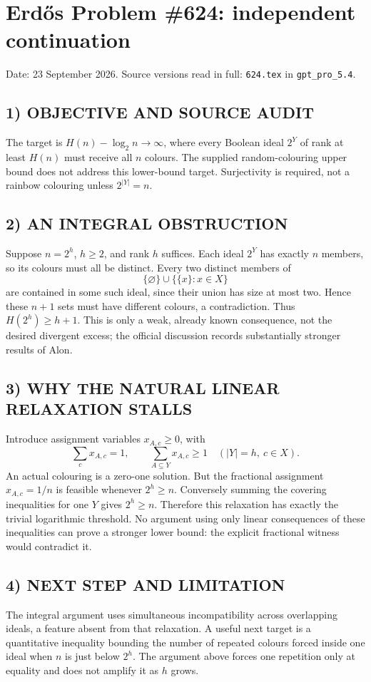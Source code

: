 \section{Erd\H{o}s Problem \#624: independent continuation}
\noindent Date: 23 September 2026. Source versions read in full: \texttt{624.tex} in \texttt{gpt\_pro\_5.4}.

\subsection*{1) OBJECTIVE AND SOURCE AUDIT}
The target is $H(n)-\log_2 n\to\infty$, where every Boolean ideal $2^Y$ of rank at least $H(n)$ must receive all $n$ colours. The supplied random-colouring upper bound does not address this lower-bound target. Surjectivity is required, not a rainbow colouring unless $2^{|Y|}=n$.
\subsection*{2) AN INTEGRAL OBSTRUCTION}
Suppose $n=2^h$, $h\ge2$, and rank $h$ suffices. Each ideal $2^Y$ has exactly $n$ members, so its colours must all be distinct. Every two distinct members of
\[
\{\varnothing\}\cup\{\{x\}:x\in X\}
\]
are contained in some such ideal, since their union has size at most two. Hence these $n+1$ sets must have different colours, a contradiction. Thus $H(2^h)\ge h+1$. This is only a weak, already known consequence, not the desired divergent excess; the official discussion records substantially stronger results of Alon.
\subsection*{3) WHY THE NATURAL LINEAR RELAXATION STALLS}
Introduce assignment variables $x_{A,c}\ge0$, with
\[
\sum_c x_{A,c}=1,\qquad \sum_{A\subseteq Y}x_{A,c}\ge1
\quad(|Y|=h,\ c\in X).
\]
An actual colouring is a zero-one solution. But the fractional assignment $x_{A,c}=1/n$ is feasible whenever $2^h\ge n$. Conversely summing the covering inequalities for one $Y$ gives $2^h\ge n$. Therefore this relaxation has exactly the trivial logarithmic threshold. No argument using only linear consequences of these inequalities can prove a stronger lower bound: the explicit fractional witness would contradict it.
\subsection*{4) NEXT STEP AND LIMITATION}
The integral argument uses simultaneous incompatibility across overlapping ideals, a feature absent from that relaxation. A useful next target is a quantitative inequality bounding the number of repeated colours forced inside one ideal when $n$ is just below $2^h$. The argument above forces one repetition only at equality and does not amplify it as $h$ grows.
